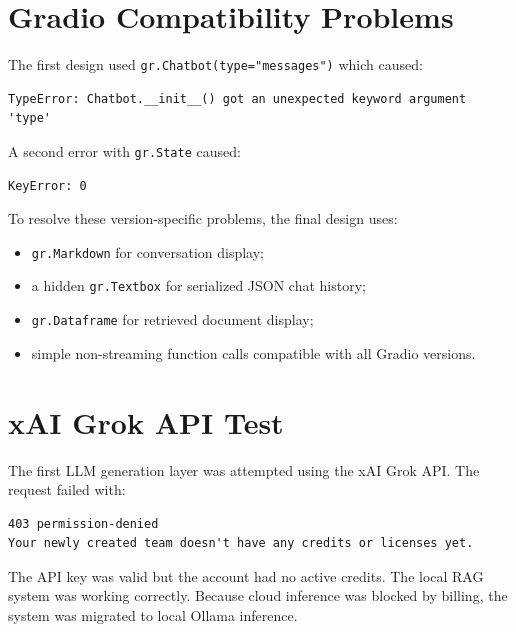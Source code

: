 \documentclass[12pt,a4paper]{report}
\begin{document}
\section{Gradio Compatibility Problems}

The first design used \texttt{gr.Chatbot(type="messages")} which caused:

\begin{lstlisting}[style=bashstyle]
TypeError: Chatbot.__init__() got an unexpected keyword argument 'type'
\end{lstlisting}

A second error with \texttt{gr.State} caused:

\begin{lstlisting}[style=bashstyle]
KeyError: 0
\end{lstlisting}

To resolve these version-specific problems, the final design uses:

\begin{itemize}
    \item \texttt{gr.Markdown} for conversation display;
    \item a hidden \texttt{gr.Textbox} for serialized JSON chat history;
    \item \texttt{gr.Dataframe} for retrieved document display;
    \item simple non-streaming function calls compatible with all Gradio versions.
\end{itemize}

\section{xAI Grok API Test}

The first LLM generation layer was attempted using the xAI Grok API. The request failed with:

\begin{lstlisting}[style=bashstyle]
403 permission-denied
Your newly created team doesn't have any credits or licenses yet.
\end{lstlisting}

The API key was valid but the account had no active credits. The local RAG system was working correctly. Because cloud inference was blocked by billing, the system was migrated to local Ollama inference.

\end{document}
